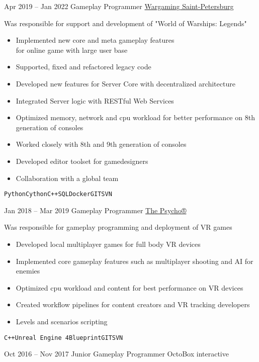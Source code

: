 \documentclass[9pt]{developercv} %
\begin{document}
\begin{entrylist}
	\entry
	{Apr 2019 -- Jan 2022}
	{Gameplay Programmer}
	{\href{https://na.wargaming.net/en/games/wowsconsole}{Wargaming Saint-Petersburg}}
	{

		Was responsible for support and development of "World of Warships: Legends"
		\begin{itemize}
			\item Implemented new core and meta gameplay features \\for online game with large user base
			\item Supported, fixed and refactored legacy code
			\item Developed new features for Server Core with decentralized architecture
			\item Integrated Server logic with RESTful Web Services
			\item Optimized memory, network and cpu workload for better performance on 8th generation of consoles
			\item Worked closely with 8th and 9th generation of consoles
			\item Developed editor toolset for gamedesigners
			\item Collaboration with a global team
		\end{itemize}
		\texttt{Python}\slashsep\texttt{Cython}\slashsep\texttt{C++}\slashsep\texttt{SQL}\slashsep\texttt{Docker}\slashsep\texttt{GIT}\slashsep\texttt{SVN}}
	\entry
	{Jan 2018 -- Mar 2019}
	{Gameplay Programmer}
	{\href{https://www.thepsycho.net/}{The Psycho®}}
	{

	Was responsible for gameplay programming and deployment of VR games
	\begin{itemize}
		\item Developed local multiplayer games for full body VR devices
		\item Implemented core gameplay features such as multiplayer shooting and AI for enemies
		\item Optimized cpu workload and content for best performance on VR devices
		\item Created workflow pipelines for content creators and VR tracking developers
		\item Levels and scenarios scripting
	\end{itemize}
	{\texttt{C++}\slashsep\texttt{Unreal Engine 4}\slashsep\texttt{Blueprint}\slashsep\texttt{GIT}\slashsep\texttt{SVN}}
	}
	\entry
	{Oct 2016 -- Nov 2017}
	{Junior Gameplay Programmer}
	{OctoBox interactive}
	{

}
\end{entrylist}
\end{document}
